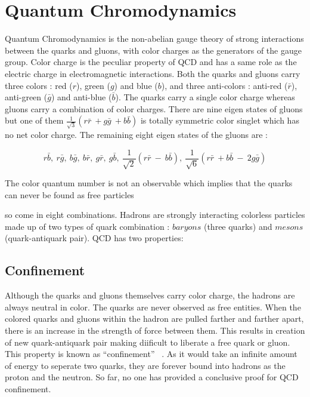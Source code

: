 \section{Quantum Chromodynamics}
Quantum Chromodynamics \cite{Ellis:1991qj, Halzen:1984mc} is the non-abelian gauge theory of strong interactions between the quarks and gluons, with color charges as the generators of the gauge group. Color charge is the peculiar property of QCD and has a same role as the electric charge in electromagnetic interactions. Both the quarks and gluons carry three colors : red ($r$), green ($g$) and blue ($b$), and three anti-colors : anti-red ($\bar{r}$), anti-green ($\bar{g}$) and anti-blue ($\bar{b}$). The quarks carry a single color charge whereas gluons carry a combination of color charges. There are nine eigen states of gluons but one of them $\frac{1}{\sqrt{3}}(r\bar{r}~\plus g\bar{g}~\plus b\bar{b})$ is totally symmetric color singlet which has no net color charge. The remaining eight eigen states of the gluons are :

\begin{equation}
r\bar{b},~r\bar{g},~b\bar{g},~b\bar{r},~g\bar{r},~g\bar{b},~\frac{1}{\sqrt{2}}(r\bar{r}~-~b\bar{b}),~\frac{1}{\sqrt{6}}(r\bar{r}~\plus b\bar{b}~-~2g\bar{g}) 
\end{equation}

The color quantum number is not an observable which implies that the quarks can never be found as free particles 

 so come in eight combinations. Hadrons are strongly interacting colorless particles made up of two types of quark combination : $baryons$ (three quarks) and $mesons$ (quark-antiquark pair). QCD has two properties:

\subsection{Confinement}
Although the quarks and gluons themselves carry color charge, the hadrons are always neutral in color. The quarks are never observed as free entities. When the colored quarks and gluons within the hadron are pulled farther and farther apart, there is an increase in the strength of force between them. This results in creation of new quark-antiquark pair making diificult to liberate a free quark or gluon. This property is known as ``confinement'' ~\cite{con,con1}. As it would take an infinite amount of energy to seperate two quarks, they are forever bound into hadrons as the proton and the neutron. So far, no one has provided a conclusive proof for QCD confinement.
     
